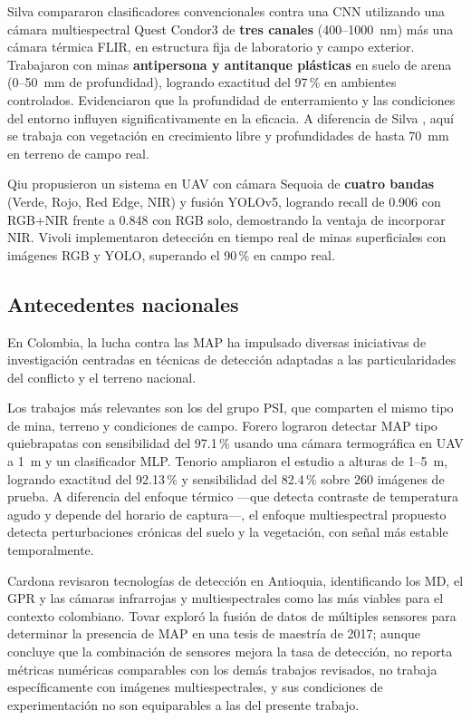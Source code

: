 Silva \etal{} \cite{silva2019} compararon clasificadores convencionales
contra una \ac{CNN} utilizando una cámara multiespectral Quest Condor3 de
\textbf{tres canales} (400--1000~nm) más una cámara térmica FLIR, en estructura
fija de laboratorio y campo exterior. Trabajaron con minas \textbf{antipersona
y antitanque plásticas} en suelo de arena (0--50~mm de profundidad), logrando
exactitud del 97\,\% en ambientes controlados. Evidenciaron que la profundidad
de enterramiento y las condiciones del entorno influyen significativamente en la
eficacia.
A diferencia de Silva \etal{}, aquí se trabaja con vegetación en crecimiento libre
y profundidades de hasta 70~mm en terreno de campo real.

Qiu \etal{} \cite{qiu2023} propusieron un sistema en \ac{UAV} con cámara
Sequoia de \textbf{cuatro bandas} (Verde, Rojo, Red Edge, NIR) y fusión YOLOv5,
logrando recall de 0.906 con RGB+NIR frente a 0.848 con RGB solo, demostrando la
ventaja de incorporar NIR. Vivoli \etal{} \cite{vivoli2024} implementaron detección
en tiempo real de minas superficiales con imágenes RGB y YOLO, superando el
90\,\% en campo real.

\subsection{Antecedentes nacionales}

En Colombia, la lucha contra las \ac{MAP} ha impulsado diversas
iniciativas de investigación centradas en técnicas de detección adaptadas
a las particularidades del conflicto y el terreno nacional.

Los trabajos más relevantes son los del grupo \ac{PSI}, que comparten el
mismo tipo de mina, terreno y condiciones de campo. Forero \etal{}
\cite{forero2022} lograron detectar \ac{MAP} tipo quiebrapatas con sensibilidad
del 97.1\,\% usando una cámara termográfica en \ac{UAV} a \SI{1}{m} y un
clasificador \ac{MLP}. Tenorio \etal{} \cite{tenorio2024} ampliaron el estudio
a alturas de 1--5~m, logrando exactitud del 92.13\,\% y sensibilidad del
82.4\,\% sobre 260 imágenes de prueba. A diferencia del enfoque térmico ---que
detecta contraste de temperatura agudo y depende del horario de captura---,
el enfoque multiespectral propuesto detecta perturbaciones crónicas del suelo y
la vegetación, con señal más estable temporalmente.

Cardona \etal{} \cite{cardona2014} revisaron tecnologías de detección en
Antioquia, identificando los \ac{MD}, el \ac{GPR} y las cámaras infrarrojas
y multiespectrales como las más viables para el contexto colombiano. Tovar
\cite{tovar2017} exploró la fusión de datos de múltiples sensores para
determinar la presencia de \ac{MAP} en una tesis de maestría de 2017;
aunque concluye que la combinación de sensores mejora la tasa de detección,
no reporta métricas numéricas comparables con los demás trabajos revisados,
no trabaja específicamente con imágenes multiespectrales, y sus condiciones
de experimentación no son equiparables a las del presente trabajo.

